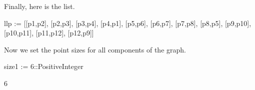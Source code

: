 \begin{xtc}
\begin{xtccomment}
Finally, here is the list.
\end{xtccomment}
\begin{spadsrc}
llp := [[p1,p2], [p2,p3], [p3,p4], [p4,p1], [p5,p6], [p6,p7], [p7,p8], [p8,p5], [p9,p10], [p10,p11], [p11,p12], [p12,p9]] 
\end{spadsrc}
\begin{TeXOutput}
\begin{fricasmath}{13}
%
\end{fricasmath}
\end{TeXOutput}
\end{xtc}
\begin{xtc}
\begin{xtccomment}
Now we set the point sizes for all components of the graph.
\end{xtccomment}
\begin{spadsrc}
size1 := 6::PositiveInteger 
\end{spadsrc}
\begin{TeXOutput}
\begin{fricasmath}{14}
6%
\end{fricasmath}
\end{TeXOutput}
\end{xtc}
